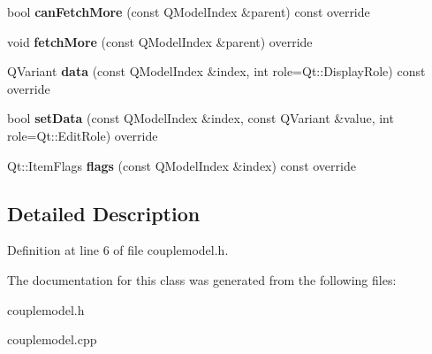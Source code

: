 \begin{DoxyCompactItemize}
bool {\bfseries can\+Fetch\+More} (const Q\+Model\+Index \&parent) const override
\item 
\mbox{\label{class_couple_model_a06bc748897683262a2415d6b1e36291d}} 
void {\bfseries fetch\+More} (const Q\+Model\+Index \&parent) override
\item 
\mbox{\label{class_couple_model_a118e5b04045603124e1e7da896cdb069}} 
Q\+Variant {\bfseries data} (const Q\+Model\+Index \&index, int role=Qt\+::\+Display\+Role) const override
\item 
\mbox{\label{class_couple_model_a495c1455dcae117e7e6901e021c96618}} 
bool {\bfseries set\+Data} (const Q\+Model\+Index \&index, const Q\+Variant \&value, int role=Qt\+::\+Edit\+Role) override
\item 
\mbox{\label{class_couple_model_afa65bca54760754a52aa5124bbd1375b}} 
Qt\+::\+Item\+Flags {\bfseries flags} (const Q\+Model\+Index \&index) const override
\end{DoxyCompactItemize}


\subsection{Detailed Description}


Definition at line 6 of file couplemodel.\+h.



The documentation for this class was generated from the following files\+:\begin{DoxyCompactItemize}
\item 
couplemodel.\+h\item 
couplemodel.\+cpp\end{DoxyCompactItemize}
